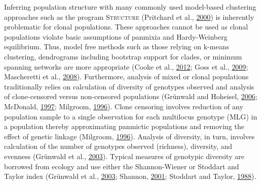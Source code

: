 \documentclass[double,12pt]{beavtex}
\begin{document}
  Inferring population structure with many commonly used model-based
  clustering approaches such as the program \textsc{Structure} (Pritchard
  et al., \protect\hyperlink{ref-pritchard2000inference}{2000}) is
  inherently problematic for clonal populations. These approaches cannot
  be used as clonal populations violate basic assumptions of panmixia and
  Hardy-Weinberg equilibrium. Thus, model free methods such as those
  relying on k-means clustering, dendrograms including bootstrap support
  for clades, or minimum spanning networks are more appropriate (Cooke et
  al., \protect\hyperlink{ref-cooke2012genome}{2012}; Goss et al.,
  \protect\hyperlink{ref-goss2009population}{2009}; Mascheretti et al.,
  \protect\hyperlink{ref-mascheretti2008reconstruction}{2008}).
  Furthermore, analysis of mixed or clonal populations traditionally
  relies on calculation of diversity of genotypes observed and analysis of
  clone-censored versus non-censored populations (Grünwald and Hoheisel,
  \protect\hyperlink{ref-Grunwald:2006}{2006}; McDonald,
  \protect\hyperlink{ref-mcdonald1997population}{1997}; Milgroom,
  \protect\hyperlink{ref-milgroom1996recombination}{1996}). Clone
  censoring involves reduction of any population sample to a single
  observation for each multilocus genotype (MLG) in a population thereby
  approximating panmictic populations and removing the effect of genetic
  linkage (Milgroom,
  \protect\hyperlink{ref-milgroom1996recombination}{1996}). Analysis of
  diversity, in turn, involves calculation of the number of genotypes
  observed (richness), diversity, and evenness (Grünwald et al.,
  \protect\hyperlink{ref-Grunwald:2003}{2003}). Typical measures of
  genotypic diversity are borrowed from ecology and use either the
  Shannon-Wiener or Stoddart and Taylor index (Grünwald et al.,
  \protect\hyperlink{ref-Grunwald:2003}{2003}; Shannon,
  \protect\hyperlink{ref-shannon2001mathematical}{2001}; Stoddart and
  Taylor, \protect\hyperlink{ref-stoddart1988genotypic}{1988}).
  
\end{document}
